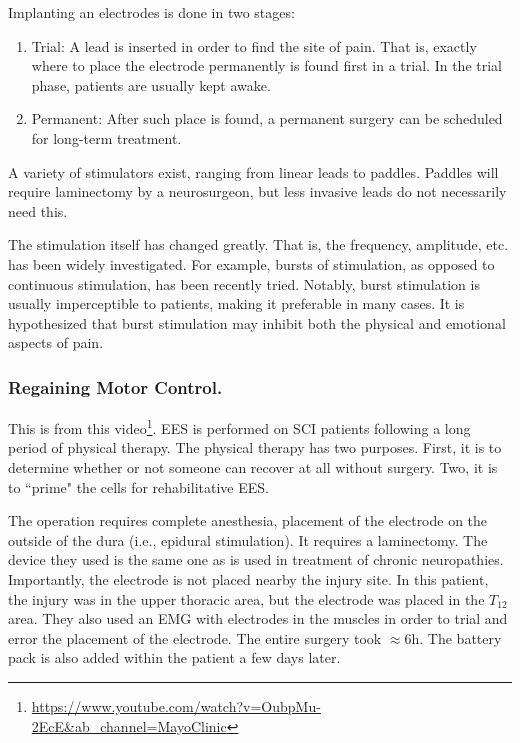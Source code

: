 \documentclass[12pt]{report}
\begin{document}
Implanting an electrodes is done in two stages:
\begin{enumerate}
    \item Trial: A lead is inserted in order to find the site of pain. That is, exactly where to place the electrode permanently is found first in a trial. In the trial phase, patients are usually kept awake. 
    \item Permanent: After such place is found, a permanent surgery can be scheduled for long-term treatment. 
\end{enumerate}

A variety of stimulators exist, ranging from linear leads to paddles. Paddles will require laminectomy by a neurosurgeon, but less invasive leads do not necessarily need this.\newline

The stimulation itself has changed greatly. That is, the frequency, amplitude, etc. has been widely investigated. For example, bursts of stimulation, as opposed to continuous stimulation, has been recently tried. Notably, burst stimulation is usually imperceptible to patients, making it preferable in many cases. It is hypothesized that burst stimulation may inhibit both the physical and emotional aspects of pain. 

\subsubsection{Regaining Motor Control.}

This is from this video\footnote{\url{https://www.youtube.com/watch?v=OubpMu-2EcE\&ab_channel=MayoClinic}}. EES is performed on SCI patients following a long period of physical therapy. The physical therapy has two purposes. First, it is to determine whether or not someone can recover at all without surgery. Two, it is to ``prime" the cells for rehabilitative EES.\newline

The operation requires complete anesthesia, placement of the electrode on the outside of the dura (i.e., epidural stimulation). It requires a laminectomy. The device they used is the same one as is used in treatment of chronic neuropathies. Importantly, the electrode is not placed nearby the injury site. In this patient, the injury was in the upper thoracic area, but the electrode was placed in the $T_{12}$ area. They also used an EMG with electrodes in the muscles in order to trial and error the placement of the electrode. The entire surgery took $\approx 6$h. The battery pack is also added within the patient a few days later.\newline
\end{document}
